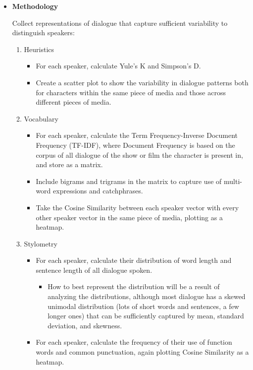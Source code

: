 \documentclass{article}
\begin{document}
\begin{titlepage}
\begin{itemize}
        \item[] \textbf{Methodology}
            
		Collect representations of dialogue that capture sufficient variability to distinguish speakers:
		
		\begin{enumerate}
			\item Heuristics
			\begin{itemize}
				\item For each speaker, calculate Yule's K and Simpson's D.
				\item Create a scatter plot to show the variability in dialogue patterns both for characters within the same piece of media and those across different pieces of media.
			\end{itemize}
		
			\item Vocabulary
			\begin{itemize}
				\item For each speaker, calculate the Term Frequency-Inverse Document Frequency (TF-IDF), where Document Frequency is based on the corpus of all dialogue of the show or film the character is present in, and store as a matrix.
				\item Include bigrams and trigrams in the matrix to capture use of multi-word expressions and catchphrases.
				\item Take the Cosine Similarity between each speaker vector with every other speaker vector in the same piece of media, plotting as a heatmap.
			\end{itemize}
		
			\item Stylometry
			\begin{itemize}
				\item For each speaker, calculate their distribution of word length and sentence length of all dialogue spoken.
				\begin{itemize}
					\item How to best represent the distribution will be a result of analyzing the distributions, although most dialogue has a skewed unimodal distribution (lots of short words and sentences, a few longer ones) that can be sufficiently captured by mean, standard deviation, and skewness.
				\end{itemize}
				\item For each speaker, calculate the frequency of their use of function words and common punctuation, again plotting Cosine Similarity as a heatmap.
			\end{itemize}
		

\end{enumerate}
\end{itemize}
\end{titlepage}
\end{document}
